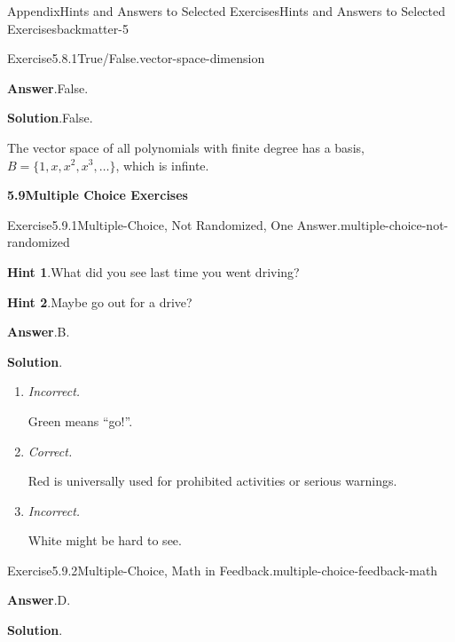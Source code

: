 \documentclass[oneside,10pt,]{book}
\newcommand{\blocktitlefont}{\relax}
\newcommand{\lititle}[1]{{\slshape#1}}
\numberwithin{equation}{section}
\begin{document}
\begin{solutions-chapter}{Appendix}{Hints and Answers to Selected Exercises}{}{Hints and Answers to Selected Exercises}{}{}{backmatter-5}
\begin{divisionsolution}{Exercise}{5.8.1}{True\slash{}False.}{vector-space-dimension}
\par\smallskip%
\noindent\textbf{\blocktitlefont Answer}.\hypertarget{vector-space-dimension-5-back}{}\quad{}False.%
\par\smallskip%
\noindent\textbf{\blocktitlefont Solution}.\hypertarget{vector-space-dimension-6-back}{}\quad{}False.%
\par
The vector space of all polynomials with finite degree has a basis, \(B = \{1,x,x^2,x^3,\dots\}\), which is infinte.%
\end{divisionsolution}%
\par\medskip
\noindent\textbf{\Large{}5.9\space\textperiodcentered\space{}Multiple Choice Exercises}
\begin{divisionsolution}{Exercise}{5.9.1}{Multiple-Choice, Not Randomized, One Answer.}{multiple-choice-not-randomized}%
\par\smallskip%
\noindent\textbf{\blocktitlefont Hint 1}.\hypertarget{multiple-choice-not-randomized-4-back}{}\quad{}What did you see last time you went driving?%
\par\smallskip%
\noindent\textbf{\blocktitlefont Hint 2}.\hypertarget{multiple-choice-not-randomized-5-back}{}\quad{}Maybe go out for a drive?%
\par\smallskip%
\noindent\textbf{\blocktitlefont Answer}.\hypertarget{multiple-choice-not-randomized-6-back}{}\quad{}B.%
\par\smallskip%
\noindent\textbf{\blocktitlefont Solution}.\hypertarget{multiple-choice-not-randomized-7-back}{}\quad{}%
\begin{enumerate}[label={\Alph*.}]
\item{}\lititle{Incorrect.}\par%
Green means ``go!''.%
\item{}\lititle{Correct.}\par%
Red is universally used for prohibited activities or serious warnings.%
\item{}\lititle{Incorrect.}\par%
White might be hard to see.%
\end{enumerate}
%
\end{divisionsolution}%
\begin{divisionsolution}{Exercise}{5.9.2}{Multiple-Choice, Math in Feedback.}{multiple-choice-feedback-math}%
\par\smallskip%
\noindent\textbf{\blocktitlefont Answer}.\hypertarget{multiple-choice-feedback-math-3-back}{}\quad{}D.%
\par\smallskip%
\noindent\textbf{\blocktitlefont Solution}.\hypertarget{multiple-choice-feedback-math-4-back}{}\quad{}%

\end{divisionsolution}
\end{solutions-chapter}
\end{document}
